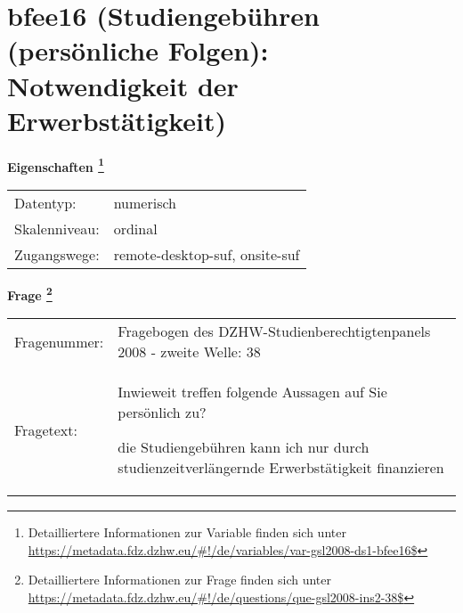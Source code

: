 
    \setcounter{footnote}{0}

    \vspace*{-1.8cm}
	\section{bfee16 (Studiengebühren (persönliche Folgen): Notwendigkeit der Erwerbstätigkeit)}
	\label{section:bfee16}



    \vspace*{0.5cm}
    \noindent\textbf{Eigenschaften
	\footnote{Detailliertere Informationen zur Variable finden sich unter
		\url{https://metadata.fdz.dzhw.eu/\#!/de/variables/var-gsl2008-ds1-bfee16$}}}\\
	\begin{tabularx}{\hsize}{@{}lX}
	Datentyp: & numerisch \\
	Skalenniveau: & ordinal \\
	Zugangswege: &
	  remote-desktop-suf, 
	  onsite-suf
 \\
    \end{tabularx}



				\vspace*{0.5cm}
                \noindent\textbf{Frage
	                \footnote{Detailliertere Informationen zur Frage finden sich unter
		              \url{https://metadata.fdz.dzhw.eu/\#!/de/questions/que-gsl2008-ins2-38$}}}\\
				\begin{tabularx}{\hsize}{@{}lX}
					Fragenummer: &
					  Fragebogen des DZHW-Studienberechtigtenpanels 2008 - zweite Welle:
					  38
 \\
					Fragetext: & Inwieweit treffen folgende Aussagen auf Sie persönlich zu?\par  die Studiengebühren kann ich nur durch studienzeitverlängernde Erwerbstätigkeit finanzieren \\
				\end{tabularx}





